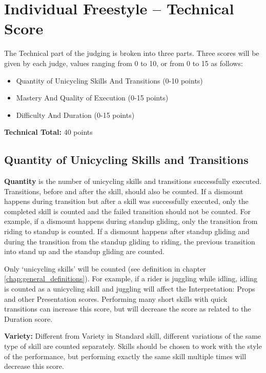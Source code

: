 \section{Individual Freestyle -- Technical Score \label{sec:freestyle_individual-technical-score}}
The Technical part of the judging is broken into three parts.
Three scores will be given by each judge, values ranging from 0 to 10, or from 0 to 15 as follows: 
\begin{itemize}
\item Quantity of Unicycling Skills And Transitions (0-10 points) 
\item Mastery And Quality of Execution (0-15 points) 
\item Difficulty And Duration (0-15 points) 
\end{itemize}
\textbf{Technical Total:} 40 points

\subsection{Quantity of Unicycling Skills and Transitions}
\textbf{Quantity} is the number of unicycling skills and transitions successfully executed.
Transitions, before and after the skill, should also be counted.
If a dismount happens during transition but after a skill was successfully executed, only the completed skill is counted and the failed transition should not be counted.
For example, if a dismount happens during standup gliding, only the transition from riding to standup is counted.
If a dismount happens after standup gliding and during the transition from the standup gliding to riding, the previous transition into stand up and the standup gliding are counted.

Only `unicycling skills' will be counted (see definition in chapter \ref{chap:general_definitions}).
For example, if a rider is juggling while idling, idling is counted as a unicycling skill and juggling will affect the Interpretation: Props and other Presentation scores.
Performing many short skills with quick transitions can increase this score, but will decrease the score as related to the Duration score.

\textbf{Variety:} Different from Variety in Standard skill, different variations of the same type of skill are counted separately.
Skills should be chosen to work with the style of the performance, but performing exactly the same skill multiple times will decrease this score.

